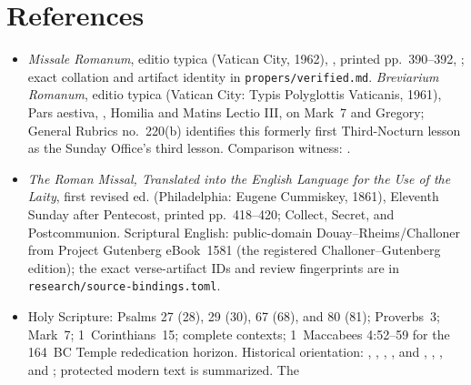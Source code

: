 \section*{References}

{\fontsize{9.2}{10.0}\selectfont
{}
\begin{itemize}[itemsep=0em,topsep=0.15em,parsep=0pt]
\item \emph{Missale Romanum}, editio typica (Vatican City, 1962),
, printed pp.~390--392,
; exact collation and artifact identity in
\texttt{propers/verified.md}. \emph{Breviarium Romanum}, editio typica
(Vatican City: Typis Polyglottis Vaticanis, 1961), Pars aestiva,
, Homilia and Matins Lectio III, on
Mark~7 and Gregory; General Rubrics no.~220(b) identifies this formerly first
Third-Nocturn lesson as the Sunday Office's third lesson. Comparison witness:
.
\item \emph{The Roman Missal, Translated into the English Language for the
Use of the Laity}, first revised ed. (Philadelphia: Eugene Cummiskey, 1861),
Eleventh Sunday after Pentecost, printed pp.~418--420; Collect, Secret, and
Postcommunion. Scriptural English: public-domain Douay--Rheims/Challoner
from Project Gutenberg eBook~1581 (the registered Challoner--Gutenberg
edition); the exact verse-artifact IDs and review fingerprints are in
\texttt{research/source-bindings.toml}.
\item Holy Scripture: Psalms 27 (28), 29 (30), 67 (68), and 80 (81);
Proverbs~3; Mark~7; 1~Corinthians~15; complete contexts; 1~Maccabees
4:52--59 for the 164~BC Temple rededication horizon. Historical
orientation: ,
,
,
, and
,
,
, and
; protected modern text is summarized.
The 

\end{itemize}}

